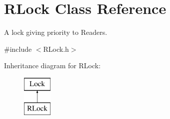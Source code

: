 \hypertarget{class_r_lock}{}\section{R\+Lock Class Reference}
\label{class_r_lock}


A lock giving priority to Readers.  




{\ttfamily \#include $<$R\+Lock.\+h$>$}

Inheritance diagram for R\+Lock\+:\begin{figure}[H]
\begin{center}
\leavevmode
\includegraphics[height=2.000000cm]{class_r_lock}
\end{center}
\end{figure}
